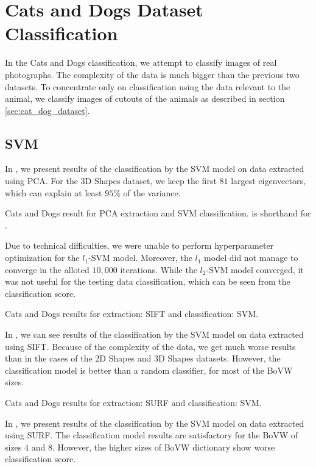 \section{Cats and Dogs Dataset Classification}
In the Cats and Dogs classification, we attempt to classify images of real photographs. The complexity of the data is much bigger than the previous two datasets. To concentrate only on classification using the data relevant to the animal, we classify images of cutouts of the animals as described in section \ref{sec:cat_dog_dataset}.

\subsection{SVM}
In , we present results of the classification by the SVM model on data extracted using PCA. For the 3D Shapes dataset, we keep the first $81$ largest eigenvectors, which can explain at least $95\%$ of the variance.
\begin{table}[ht!]
    \centering
    
    \caption[Cats and Dogs result for PCA extraction and SVM classification]{Cats and Dogs result for PCA extraction and SVM classification.  is shorthand for .}
    \label{tab:iiit_PCA_SVM}
\end{table}

Due to technical difficulties, we were unable to perform hyperparameter optimization for the $l_1$-SVM model. Moreover, the $l_1$ model did not manage to converge in the alloted $10,000$ iterations. While the $l_2$-SVM model converged, it was not useful for the testing data classification, which can be seen from the classification score.

\begin{table}[ht!]
    \centering
    
    \caption[Cats and Dogs results for extraction: SIFT and classification: SVM]{Cats and Dogs results for extraction: SIFT and classification: SVM.}
    \label{tab:iiit_SIFT_SVM}
\end{table}
In , we can see results of the classification by the SVM model on data extracted using SIFT. Because of the complexity of the data, we get much worse results than in the cases of the 2D Shapes and 3D Shapes datasets. However, the classification model is better than a random classifier, for most of the BoVW sizes.

\begin{table}[ht!]
    \centering
    
    \caption[Cats and Dogs results for extraction: SURF and classification: SVM]{Cats and Dogs results for extraction: SURF and classification: SVM.}
    \label{tab:iiit_SURF_SVM}
\end{table}
In , we present results of the classification by the SVM model on data extracted using SURF. The classification model results are satisfactory for the BoVW of sizes $4$ and $8$. However, the higher sizes of BoVW dictionary show worse classification score.

